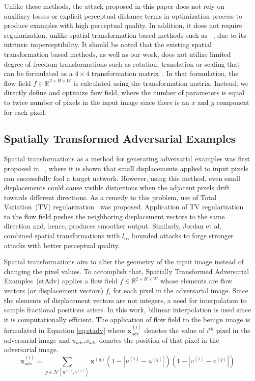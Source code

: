 Unlike these methods, the attack proposed in this paper does not rely on auxiliary losses or explicit perceptual distance terms in optimization process to produce examples with high perceptual quality. In addition, it does not require regularization, unlike spatial transformation based methods such as ~\cite{xiao2018spatially}, due to its intrinsic imperceptibility. It should be noted that the existing spatial transformation based methods, as well as our work, does not utilize limited degree of freedom transformations such as rotation, translation or scaling that can be formulated as a \(4\times4\) transformation matrix~\cite{jaderberg2015spatial}. In that formulation, the flow field \(f \in \mathbb{R}^{2\times H \times W}\) is calculated using the transformation matrix. Instead, we directly define and optimize flow field, where the number of parameters is equal to twice number of pixels in the input image since there is an \(x\) and \(y\) component for each pixel.

\subsection{Spatially Transformed Adversarial Examples}

Spatial transformations as a method for generating adversarial examples was first proposed in ~\cite{xiao2018spatially}, where it is shown that small displacements applied to input pixels can successfully fool a target network. However, using this method, even small displacements could cause visible distortions when the adjacent pixels drift towards different directions. As a remedy to this problem, use of Total Variation~(TV) regularization~\cite{estrela2016total} was proposed. Application of TV regularization to the flow field pushes the neighboring displacement vectors to the same direction and, hence, produces smoother output. Similarly, Jordan et al.~\cite{jordan2019quantifying} combined spatial transformations with \(l_\infty\) bounded attacks to forge stronger attacks with better perceptual quality.

Spatial transformations aim to alter the geometry of the input image instead of changing the pixel values. To accomplish that, Spatially Transformed Adversarial Examples~(stAdv) applies a flow field \(f \in \mathbb{R}^{2\times H \times W}\) whose elements are flow vectors (or displacement vectors) \(f_i\) for each pixel in the adversarial image. Since the elements of displacement vectors are not integers, a need for interpolation to sample fractional positions arises. In this work, bilinear interpolation is used since it is computationally efficient. The application of flow field to the benign image is formulated in Equation \ref{eq:stadv} where \(\mathbf{x}_{\mathrm{adv}}^{(i)}\) denotes the value of $i^{th}$ pixel in the adversarial image and \(u_{adv}\),\(v_{adv}\) denotes the position of that pixel in the adversarial image.
\begin{equation}
    \label{eq:stadv}
    \mathbf{x}_{\mathrm{adv}}^{(i)}=\sum_{g \in \mathcal{N}\left(u^{(i)}, v^{(i)}\right\rangle} \mathbf{x}^{(q)}\left(1-\left|u^{(i)}-u^{(q)}\right|\right)\left(1-\left|v^{(i)}-v^{(q)}\right|\right)
\end{equation}


